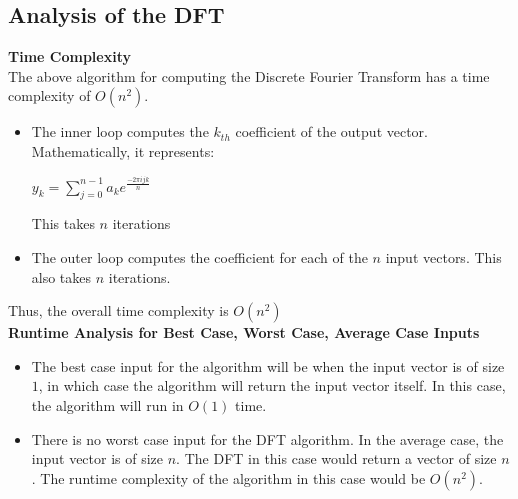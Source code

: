 \documentclass{article}
\begin{document}
\subsection{Analysis of the DFT}
\textbf{Time Complexity} \\
The above algorithm for computing the Discrete Fourier Transform has a time complexity of $O(n^{2})$. 
\begin{itemize}
\item The inner loop computes the $k_{th}$ coefficient of the output vector. Mathematically, it represents:
\begin{center}
$y_{k}=\sum_{j=0}^{n-1}a_{k}e^{\frac{-2\pi ijk}{n}}$
\end{center}
This takes $n$ iterations
\item
The outer loop computes the coefficient for each of the $n$ input vectors. This also takes $n$ iterations.
\end{itemize}

Thus, the overall time complexity is $O(n^{2})$ \\

\textbf{Runtime Analysis for Best Case, Worst Case, Average Case Inputs}
\begin{itemize}
\item
The best case input for the algorithm will be when the input vector is of size $1$, in which case the algorithm will return the input vector itself. In this case, the algorithm will run in $O(1)$ time.
\item
There is no worst case input for the DFT algorithm. In the average case, the input vector is of size $n$. The DFT in this case would return a vector of size $n$. The runtime complexity of the algorithm in this case would be $O(n^{2})$.
\end{itemize}
\end{document}
